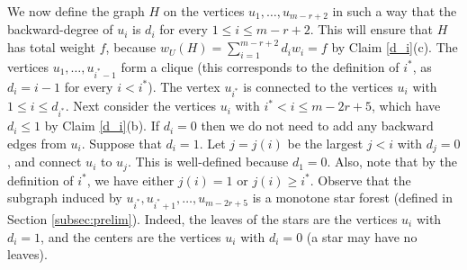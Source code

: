\documentclass[11pt]{article}
\let\oldendproof\endproof
\renewenvironment{proof}[1][\proofname]{%
	\oldproof[\bf #1]%
}{\oldendproof}
\theoremstyle{plain}
\begin{document}
\begin{proof}[Proof of Lemma \ref{r-graphs induction base case}]
    


    We now define the graph $H$ on the vertices $u_1,\dots,u_{m-r+2}$ in such a way that the backward-degree of $u_i$ is $d_i$ for every $1 \leq i \leq m-r+2$. This will ensure that $H$ has total weight $f$, because $w_U(H) = \sum_{i=1}^{m-r+2} d_i w_i = f$ by Claim \ref{d_i}(c).
    The vertices $u_1,\dots,u_{i^*-1}$ form a clique (this corresponds to the definition of $i^*$, as $d_i = i-1$ for every $i < i^*$). The vertex $u_{i^*}$ is connected to the vertices $u_i$ with $1 \leq i \leq d_{i^*}$. 
    Next consider the vertices $u_i$ with $i^* < i \leq m-2r+5$, which have $d_i \leq 1$ by Claim \ref{d_i}(b). 
    If $d_i = 0$ then we do not need to add any backward edges from $u_i$. 
    Suppose that $d_i = 1$.
    Let $j = j(i)$ be the largest $j < i$ with $d_j = 0$, and connect $u_i$ to $u_j$. This is well-defined because $d_1 = 0$. Also, note that by the definition of $i^*$, we have either $j(i) = 1$ or $j(i) \geq i^*$.
    Observe that the subgraph induced by $u_{i^*},u_{i^*+1},\dots,u_{m-2r+5}$ is a monotone star forest (defined in Section \ref{subsec:prelim}). Indeed, the leaves of the stars are the vertices $u_i$ with $d_i = 1$, and the centers are the vertices $u_i$ with $d_i = 0$ (a star may have no leaves). 


\end{proof}
\end{document}
